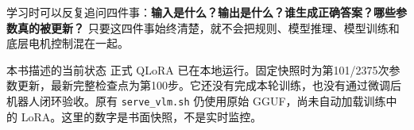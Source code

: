 \documentclass[UTF8,fontset=none,zihao=-4,oneside,openany]{ctexbook}
\begin{document}
学习时可以反复追问四件事：\textbf{输入是什么？输出是什么？谁生成正确答案？哪些参数真的被更新？} 只要这四件事始终清楚，就不会把规则、模型推理、模型训练和底层电机控制混在一起。

\begin{notebox}{本书描述的当前状态}
正式 QLoRA 已在本地运行。固定快照时为第101/2375次参数更新，最新完整检查点为第100步。它还没有完成本轮训练，也没有通过微调后机器人闭环验收。原有 \texttt{serve\_vlm.sh} 仍使用原始 GGUF，尚未自动加载训练中的 LoRA。这里的数字是书面快照，不是实时监控。
\end{notebox}
\tableofcontents
\mainmatter









\appendix

\backmatter

\end{document}
